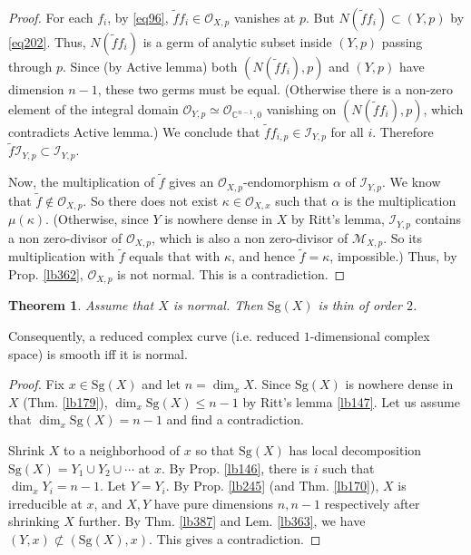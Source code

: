 \documentclass[12pt,b5paper,notitlepage]{report}
\theoremstyle{definition}
\theoremstyle{plain}
\newtheorem{thm}[df]{Theorem}
\newcommand{\wtd}{\widetilde}
\newcommand{\scr}{\mathscr}
\newcommand{\Cbb}{\mathbb C}
\newcommand{\Sg}{\mathrm{Sg}}
\numberwithin{equation}{section}
\begin{document}
\begin{proof}
For each $f_i$,  by \eqref{eq96}, $\wtd ff_i\in\scr O_{X,p}$ vanishes at $p$. But $N(\wtd ff_i)\subset (Y,p)$ by \eqref{eq202}. Thus, $N(\wtd ff_i)$ is a germ of analytic subset inside $(Y,p)$ passing through $p$. Since (by Active lemma) both $(N(\wtd ff_i),p)$ and $(Y,p)$ have dimension $n-1$, these two germs must be equal. (Otherwise there is a non-zero element of the integral domain $\scr O_{Y,p}\simeq\scr O_{\Cbb^{n-1},0}$ vanishing on $(N(\wtd ff_i),p)$, which contradicts Active lemma.) We conclude that $\wtd ff_{i,p}\in\scr I_{Y,p}$ for all $i$. Therefore $\wtd f\scr I_{Y,p}\subset\scr I_{Y,p}$. 

Now, the multiplication of $\wtd f$ gives an $\scr O_{X,p}$-endomorphism $\alpha$ of $\scr I_{Y,p}$. We know that $\wtd f\notin\scr O_{X,p}$. So there does not exist $\kappa\in\scr O_{X,x}$ such that $\alpha$ is the multiplication $\mu(\kappa)$. (Otherwise, since $Y$ is nowhere dense in $X$ by Ritt's lemma, $\scr I_{Y,p}$ contains a non zero-divisor of $\scr O_{X,p}$, which is also a non zero-divisor of $\scr M_{X,p}$. So its multiplication with $\wtd f$ equals that with $\kappa$, and hence $\wtd f=\kappa$, impossible.) Thus, by Prop. \ref{lb362}, $\scr O_{X,p}$ is not normal. This is a contradiction.
\end{proof}



\begin{thm}\label{lb232}
Assume that $X$ is normal. Then $\Sg(X)$ is thin of order $2$.
\end{thm}



Consequently, a reduced complex curve (i.e. reduced $1$-dimensional complex space) is smooth iff it is normal.

\begin{proof}
Fix $x\in \Sg(X)$ and let $n=\dim_xX$. Since $\Sg(X)$ is nowhere dense in $X$ (Thm. \ref{lb179}), $\dim_x\Sg(X)\leq n-1$  by Ritt's lemma \ref{lb147}. Let us assume that $\dim_x\Sg(X)=n-1$ and find a contradiction.

Shrink $X$ to a neighborhood of $x$ so that $\Sg(X)$ has local decomposition $\Sg(X)=Y_1\cup Y_2\cup\cdots$ at $x$. By Prop. \ref{lb146}, there is $i$ such that $\dim_x Y_i=n-1$. Let $Y=Y_i$. By Prop. \ref{lb245} (and Thm. \ref{lb170}), $X$ is irreducible at $x$, and $X,Y$ have pure dimensions $n,n-1$ respectively after shrinking $X$ further. By Thm. \ref{lb387} and Lem. \ref{lb363}, we have $(Y,x)\nsubset (\Sg(X),x)$. This gives a contradiction.
\end{proof}
\end{document}
